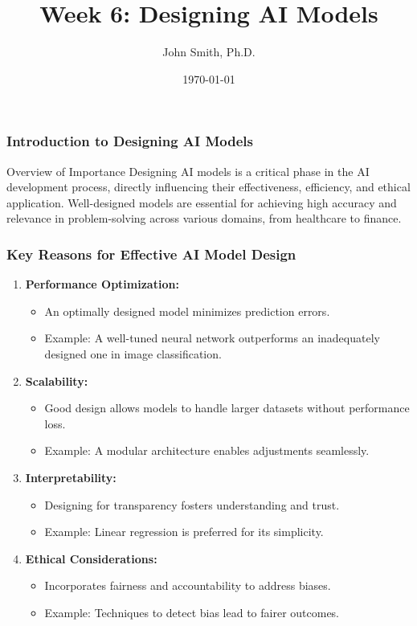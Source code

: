 \documentclass[aspectratio=169]{beamer}
\title[Week 6: Designing AI Models]{Week 6: Designing AI Models}
\author[J. Smith]{John Smith, Ph.D.}
\institute[University Name]{
  Department of Computer Science\\
  University Name\\
  \vspace{0.3cm}
  Email: email@university.edu\\
  Website: www.university.edu
}
\date{\today}
\begin{document}
\frame{\titlepage}

\begin{frame}[fragile]
    \frametitle{Introduction to Designing AI Models}
    \begin{block}{Overview of Importance}
        Designing AI models is a critical phase in the AI development process, directly influencing their effectiveness, efficiency, and ethical application. Well-designed models are essential for achieving high accuracy and relevance in problem-solving across various domains, from healthcare to finance.
    \end{block}
\end{frame}

\begin{frame}[fragile]
    \frametitle{Key Reasons for Effective AI Model Design}
    \begin{enumerate}
        \item \textbf{Performance Optimization:} 
        \begin{itemize}
            \item An optimally designed model minimizes prediction errors.
            \item Example: A well-tuned neural network outperforms an inadequately designed one in image classification.
        \end{itemize}
        
        \item \textbf{Scalability:}
        \begin{itemize}
            \item Good design allows models to handle larger datasets without performance loss.
            \item Example: A modular architecture enables adjustments seamlessly.
        \end{itemize}
        
        \item \textbf{Interpretability:}
        \begin{itemize}
            \item Designing for transparency fosters understanding and trust.
            \item Example: Linear regression is preferred for its simplicity.
        \end{itemize}
        
        \item \textbf{Ethical Considerations:}
        \begin{itemize}
            \item Incorporates fairness and accountability to address biases.
            \item Example: Techniques to detect bias lead to fairer outcomes.
        \end{itemize}
        

\end{enumerate}
\end{frame}
\end{document}

